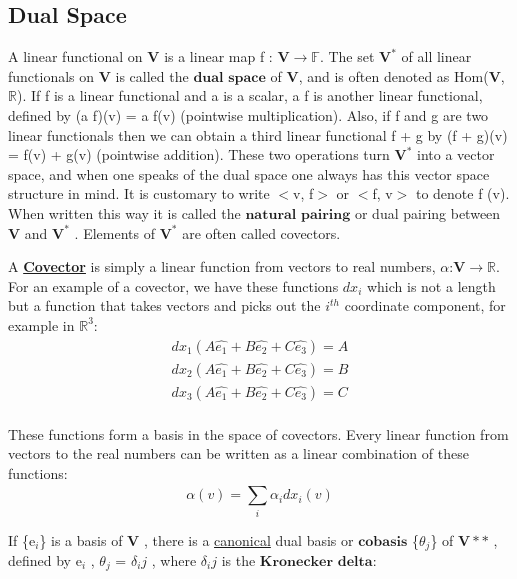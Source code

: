 \subsection{Dual Space}
A linear functional on $\textbf{V}$ is a linear map f : $\textbf{V} \rightarrow \mathbb{F}$. The set $\textbf{V} ^\ast$  of all linear
functionals on $\textbf{V}$ is called the $\textbf{dual space}$ of $\textbf{V}$, and is often denoted as Hom($\textbf{V}$, $\mathbb{R}$).
If f is a linear functional and a is a scalar, a f is another linear functional, defined
by (a f)(v) = a f(v) (pointwise multiplication). Also, if f and g are two linear
functionals then we can obtain a third linear functional f + g by (f + g)(v) =
f(v) + g(v) (pointwise addition). These two operations turn $\textbf{V}^ \ast
$  into a vector space, and when one speaks of the dual space one always has 
this vector space structure in mind.
It is customary to write $<$v, f$>$  or  $<$f, v$>$ to denote f (v). When written this way
it is called the $\textbf{natural pairing}$ or dual pairing between $\textbf{V}$ and $\textbf{V}^ \ast$ .
Elements of $\textbf{V}^ \ast$ are often called covectors.

A \href{https://math.stackexchange.com/questions/240491/what-is-a-covector-and-what-is-it-used-for}{\textbf{Covector}} 
is simply a linear function from vectors to real numbers, $\alpha$:$\textbf{V} \rightarrow \mathbb{R}$. 
For an example of a covector, we have these functions $dx_i$ which
is not a length but a function that takes vectors and picks out the $i^{th}$
coordinate component, for example in $\mathbb{R}^3$:
\begin{equation}
    \begin{aligned}
        dx_1 (A\hat{e_1} + B\hat{e_2} + C\hat{e_3}) = A \\
        dx_2 (A\hat{e_1} + B\hat{e_2} + C\hat{e_3}) = B \\
        dx_3 (A\hat{e_1} + B\hat{e_2} + C\hat{e_3}) = C  \\
    \end{aligned}
\end{equation}

These functions form a basis in the space of covectors. 
Every linear function from vectors to the real numbers can be written as a linear combination of these functions:
\begin{equation}
    \alpha (v) = \sum_{i}^{} \alpha_i dx_i(v)
\end{equation}

If \{e$_i$\} is a basis of $\textbf{V}$ , there is a \href{https://math.stackexchange.com/questions/490342/what-is-meant-by-canonical}{canonical} dual basis or $\textbf{cobasis}$ \{$\theta_j$\} of $\textbf{V}*\ast$ ,
defined by e$_i$ , $\theta_j$ = $\delta_ij$ , where $\delta_ij$ is the $\textbf{Kronecker delta}$:

